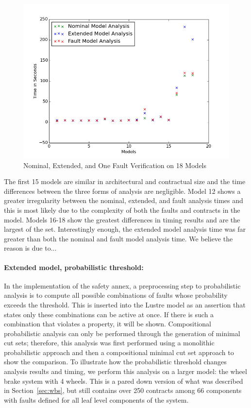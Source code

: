 \begin{figure}[htbp]
	\begin{center}
		\includegraphics[width=.7\textwidth]{images/graphComp15Models.png}
	\end{center}
	\vspace{-0.3in}
	\caption{Nominal, Extended, and One Fault Verification on 18 Models}
	\label{fig:graphComp15Models}
\end{figure}

The first 15 models are similar in architectural and contractual size and the time differences between the three forms of analysis are negligible. Model 12 shows a greater irregularity between the nominal, extended, and fault analysis times and this is most likely due to the complexity of both the faults and contracts in the model. Models 16-18 show the greatest differences in timing results and are the largest of the set. Interestingly enough, the extended model analysis time was far greater than both the nominal and fault model analysis time. We believe the reason is due to... 

\paragraph{Extended model, probabilistic threshold:} In the implementation of the safety annex, a preprocessing step to probabilistic analysis is to compute all possible combinations of faults whose probability exceeds the threshold. This is inserted into the Lustre model as an assertion that states only these combinations can be active at once. If there is such a combination that violates a property, it will be shown. Compositional probabilistic analysis can only be performed through the generation of minimal cut sets; therefore, this analysis was first performed using a monolithic probabilistic approach and then a compositional minimal cut set approach to show the comparison. To illustrate how the probabilistic threshold changes analysis results and timing, we perform this analysis on a larger model: the wheel brake system with 4 wheels. This is a pared down version of what was described in Section~\ref{sec:wbs}, but still contains over 250 contracts among 66 components with faults defined for all leaf level components of the system. 

